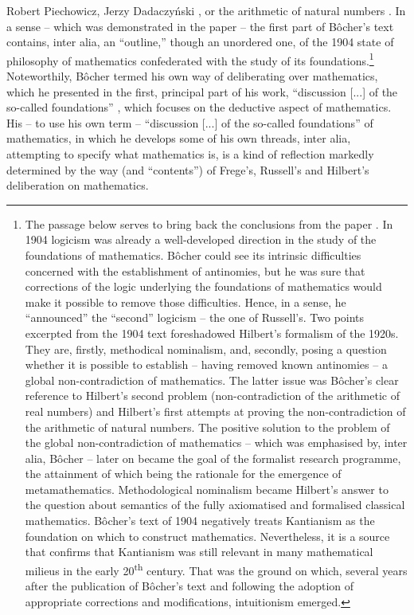\begin{artengenv}{Robert Piechowicz, Jerzy Dadaczyński}
\parencite[][]{hilbert_uber_1900},
or the arithmetic of natural numbers 
\parencite[][]{hilbert_uber_1905}.
In a sense -- which was demonstrated in the paper 
\parencite[][]{dadaczynski_tendencje_2015}
 -- the first part of Bôcher's text contains, inter alia, an ``outline,'' though an unordered one, of the 1904 state of philosophy of mathematics confederated with the study of its foundations.\footnote{The passage below serves to bring back the conclusions from the paper 
\parencite[][]{dadaczynski_tendencje_2015}.
 In 1904 logicism was already a well-developed direction in the study of the foundations of mathematics. Bôcher could see its intrinsic difficulties concerned with the establishment of antinomies, but he was sure that corrections of the logic underlying the foundations of mathematics would make it possible to remove those difficulties. Hence, in a sense, he ``announced'' the ``second'' logicism -- the one of Russell's. Two points excerpted from the 1904 text foreshadowed Hilbert's formalism of the 1920s. They are, firstly, methodical nominalism, and, secondly, posing a question whether it is possible to establish -- having removed known antinomies -- a global non-contradiction of mathematics. The latter issue was Bôcher's clear reference to Hilbert's second problem (non-contradiction of the arithmetic of real numbers) and Hilbert's first attempts at proving the non-contradiction of the arithmetic of natural numbers. The positive solution to the problem of the global non-contradiction of mathematics -- which was emphasised by, inter alia, Bôcher -- later on became the goal of the formalist research programme, the attainment of which being the rationale for the emergence of metamathematics. Methodological nominalism became Hilbert's answer to the question about semantics of the fully axiomatised and formalised classical mathematics. Bôcher's text of 1904 negatively treats Kantianism as the foundation on which to construct mathematics. Nevertheless, it is a source that confirms that Kantianism was still relevant in many mathematical milieus in the early 20\textsuperscript{th} century. That was the ground on which, several years after the publication of Bôcher's text and following the adoption of appropriate corrections and modifications, intuitionism emerged.} Noteworthily, Bôcher termed his own way of deliberating over mathematics, which he presented in the first, principal part of his work, ``discussion [...] of the so-called foundations'' 
\parencite[][pp.132–133]{bocher_fundamental_1904},
 which focuses on the deductive aspect of mathematics. His -- to use his own term -- ``discussion [...] of the so-called foundations'' of mathematics, in which he develops some of his own threads, inter alia, attempting to specify what mathematics is, is a kind of reflection markedly determined by the way (and ``contents'') of Frege's, Russell's and Hilbert's deliberation on mathematics.


\end{artengenv}
